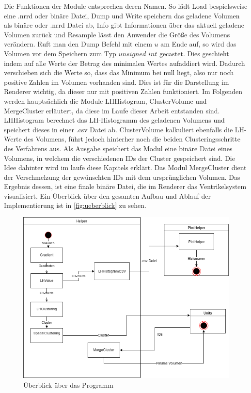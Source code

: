 \newline
Die Funktionen der Module entsprechen deren Namen. So lädt Load bespielsweise eine .nrrd oder binäre Datei, Dump und Write speichern das geladene Volumen als binäre oder .nrrd Datei ab, Info gibt Informationen über das aktuell geladene Volumen zurück und Resample lässt den Anwender die Größe des Volumens verändern. Ruft man den Dump Befehl mit einem $u$ am Ende auf, so wird das Volumen vor dem Speichern zum Typ $unsigned$ $int$ gecastet. Dies geschieht indem auf alle Werte der Betrag des minimalen Wertes aufaddiert wird. Dadurch verschieben sich die Werte so, dass das Minimum bei null liegt, also nur noch positive Zahlen im Volumen vorhanden sind. Dies ist für die Darstellung im Renderer wichtig, da dieser nur mit positiven Zahlen funktioniert.
\newline
Im Folgenden werden hauptsächlich die Module LHHistogram, ClusterVolume und MergeCluster erläutert, da diese im Laufe dieser Arbeit entstanden sind. LHHistogram berechnet das LH-Histogramm des geladenen Volumens und speichert dieses in einer .csv Datei ab. ClusterVolume kalkuliert ebenfalls die LH-Werte des Volumens, führt jedoch hinterher noch die beiden Clusteringsschritte des Verfahrens aus. Als Ausgabe speichert das Modul eine binäre Datei eines Volumens, in welchem die verschiedenen IDs der Cluster gespeichert sind. Die Idee dahinter wird im laufe diese Kapitels erklärt. Das Modul MergeCluster dient der Verschmelzung der gewünschten IDs mit dem ursprünglichen Volumen. Das Ergebnis dessen, ist eine finale binäre Datei, die im Renderer das Ventrikelsystem visualisiert. Ein Überblick über den gesamten Aufbau und Ablauf der Implementierung ist in  \autoref{fig:ueberblick} zu sehen.

\begin{figure}
\centering 
\includegraphics[width=\textwidth]{Logos/Ueberblick.png}
\caption{Überblick über das Programm} 
\label{fig:ueberblick} 
\end{figure}

